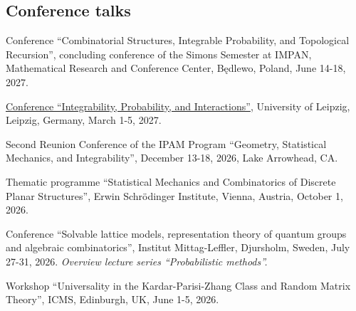 \documentclass[letterpaper,11pt]{article}
\begin{document}


\subsection*{Conference talks}

\begin{etaremune}

\item Conference ``Combinatorial Structures, Integrable Probability, and Topological Recursion'',
concluding conference of the Simons Semester at IMPAN,
Mathematical Research and Conference Center, B\k{e}dlewo, Poland,
June 14-18, 2027.

\item \href{https://sites.google.com/view/integrability-probability/}{Conference ``Integrability, Probability, and Interactions''},
University of Leipzig, Leipzig, Germany,
March 1-5, 2027.


\item Second Reunion Conference of the
IPAM Program ``Geometry, Statistical Mechanics, and Integrability'',
December 13-18, 2026, Lake Arrowhead, CA.

\item Thematic programme ``Statistical Mechanics and Combinatorics of Discrete Planar Structures'',
Erwin Schr\"odinger Institute, Vienna, Austria,
October 1, 2026.

\item Conference ``Solvable lattice models, representation theory of quantum groups and algebraic combinatorics'',
Institut Mittag-Leffler, Djursholm, Sweden,
July 27-31, 2026.
\emph{Overview lecture series ``Probabilistic methods''.}

\item Workshop ``Universality in the Kardar-Parisi-Zhang Class and Random Matrix Theory'',
ICMS, Edinburgh, UK,
June 1-5, 2026.


\end{etaremune}
\end{document}
